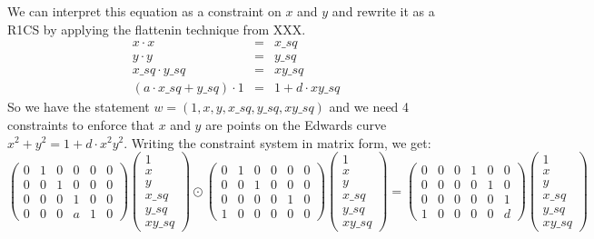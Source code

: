 We can interpret this equation as a constraint on $x$ and $y$ and rewrite it as a R1CS by applying the flattenin technique from XXX.
$$
\begin{array}{lcr}
x \cdot x &=& x\_sq\\
y \cdot y &=& y\_sq\\
x\_sq \cdot y\_sq &=& xy\_sq\\
(a\cdot x\_sq+y\_sq)\cdot 1 &=& 1+d\cdot xy\_sq
\end{array}
$$
So we have the statement $w=(1,x,y,x\_sq, y\_sq, xy\_sq)$ and we need 4 constraints to enforce that $x$ and $y$ are points on the Edwards curve $x^2+y^2= 1+d\cdot x^2y^2$. Writing the constraint system in matrix form, we get:
\begingroup
    \fontsize{9pt}{9pt}\selectfont
$$
\begin{pmatrix}
0 & 1 & 0 & 0 & 0 & 0 \\
0 & 0 & 1 & 0 & 0 & 0 \\
0 & 0 & 0 & 1 & 0 & 0 \\
0 & 0 & 0 & a & 1 & 0 
\end{pmatrix} \begin{pmatrix} 1 \\ x \\ y \\ x\_sq \\ y\_sq \\ xy\_sq \end{pmatrix}\odot
\begin{pmatrix}
0 & 1 & 0 & 0 & 0 & 0 \\
0 & 0 & 1 & 0 & 0 & 0 \\
0 & 0 & 0 & 0 & 1 & 0 \\
1 & 0 & 0 & 0 & 0 & 0 
\end{pmatrix}  \begin{pmatrix} 1 \\ x \\ y \\ x\_sq \\ y\_sq \\ xy\_sq \end{pmatrix} =
\begin{pmatrix}
0 & 0 & 0 & 1 & 0 & 0 \\
0 & 0 & 0 & 0 & 1 & 0 \\
0 & 0 & 0 & 0 & 0 & 1 \\
1 & 0 & 0 & 0 & 0 & d 
\end{pmatrix} \begin{pmatrix} 1 \\ x \\ y \\ x\_sq \\ y\_sq \\ xy\_sq \end{pmatrix}
$$
